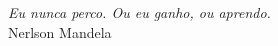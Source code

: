 
\chapter*{}
\vspace{15cm}
\begin{flushright}
	\textit
	{
		Eu nunca perco. Ou eu ganho, ou aprendo.
	}\medskip\\ 
	Nerlson Mandela
\end{flushright}